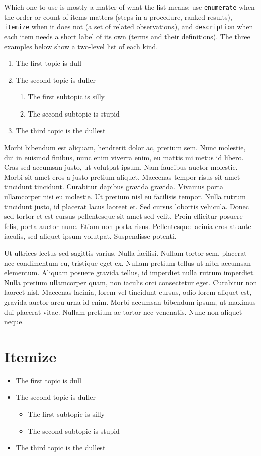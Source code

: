 Which one to use is mostly a matter of what the list means: use
\texttt{enumerate} when the order or count of items matters (steps in a
procedure, ranked results), \texttt{itemize} when it does not (a set of
related observations), and \texttt{description} when each item needs a
short label of its own (terms and their definitions). The three examples
below show a two-level list of each kind.
\begin{enumerate}
\item The first topic is dull
\item The second topic is duller
\begin{enumerate}
\item The first subtopic is silly
\item The second subtopic is stupid
\end{enumerate}
\item The third topic is the dullest
\end{enumerate}
Morbi bibendum est aliquam, hendrerit dolor ac, pretium sem. Nunc molestie, dui in euismod finibus, nunc enim viverra enim, eu mattis mi metus id libero. Cras sed accumsan justo, ut volutpat ipsum. Nam faucibus auctor molestie. Morbi sit amet eros a justo pretium aliquet. Maecenas tempor risus sit amet tincidunt tincidunt. Curabitur dapibus gravida gravida. Vivamus porta ullamcorper nisi eu molestie. Ut pretium nisl eu facilisis tempor. Nulla rutrum tincidunt justo, id placerat lacus laoreet et. Sed cursus lobortis vehicula. Donec sed tortor et est cursus pellentesque sit amet sed velit. Proin efficitur posuere felis, porta auctor nunc. Etiam non porta risus. Pellentesque lacinia eros at ante iaculis, sed aliquet ipsum volutpat. Suspendisse potenti.

Ut ultrices lectus sed sagittis varius. Nulla facilisi. Nullam tortor sem, placerat nec condimentum eu, tristique eget ex. Nullam pretium tellus ut nibh accumsan elementum. Aliquam posuere gravida tellus, id imperdiet nulla rutrum imperdiet. Nulla pretium ullamcorper quam, non iaculis orci consectetur eget. Curabitur non laoreet nisl. Maecenas lacinia, lorem vel tincidunt cursus, odio lorem aliquet est, gravida auctor arcu urna id enim. Morbi accumsan bibendum ipsum, ut maximus dui placerat vitae. Nullam pretium ac tortor nec venenatis. Nunc non aliquet neque. 

\section*{Itemize}
\begin{itemize}
\item The first topic is dull
\item The second topic is duller
\begin{itemize}
\item The first subtopic is silly
\item The second subtopic is stupid
\end{itemize}
\item The third topic is the dullest
\end{itemize}

